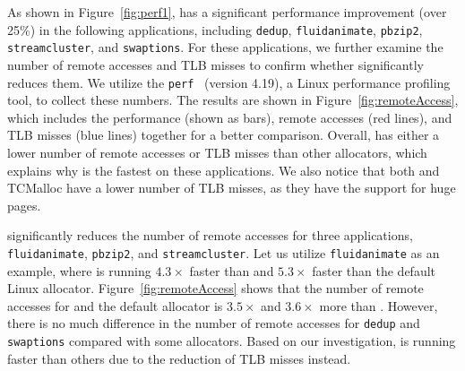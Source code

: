 As shown in Figure~\ref{fig:perf1}, \NM{} has a significant performance improvement (over 25\%) in the following applications, including \texttt{dedup}, \texttt{fluidanimate}, \texttt{pbzip2}, \texttt{streamcluster}, and \texttt{swaptions}. For these applications, we further examine the number of remote accesses and TLB misses to confirm whether \NM{} significantly reduces them. 
We utilize the \texttt{perf}~\cite{perfweb} (version 4.19), a Linux performance profiling tool, to collect these numbers. 
The results are shown in Figure~\ref{fig:remoteAccess}, which includes the performance (shown as bars), remote accesses (red lines), and TLB misses (blue lines) together for a better comparison. 
Overall, \NM{} has either a lower number of remote accesses or TLB misses than other allocators, which explains why \NM{} is the fastest on these applications. We also notice that both \NM{} and TCMalloc have a lower number of TLB misses, as they have the support for huge pages.   

\NM{} significantly reduces the number of remote accesses for three applications, \texttt{fluidanimate}, \texttt{pbzip2}, and \texttt{streamcluster}. Let us utilize \texttt{fluidanimate} as an example, where \NM{} is running $4.3\times$ faster than \TN{} and $5.3\times$ faster than the default Linux allocator. Figure~\ref{fig:remoteAccess} shows that the number of remote accesses for \TN{} and the default allocator is $3.5\times$ and $3.6\times$ more than \NM{}. However, there is no much difference in the number of remote accesses for \texttt{dedup} and \texttt{swaptions} compared with some allocators. Based on our investigation, \NM{} is running faster than others due to the reduction of TLB misses instead. 

